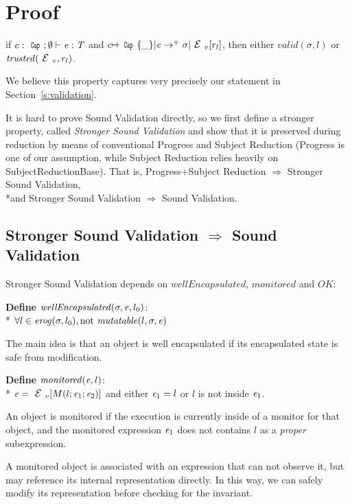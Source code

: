 \appendix
\section{Proof}
\label{s:proof}

\begin{theorem}
	if $c:\Kw{Cap};\emptyset\vdash \e: \T$ and
	$c\mapsto\Kw{Cap}\{\_\}|\e\rightarrow^+ \sigma|\ctx_v[r_l]$, then
	either $valid(\sigma,l)$ or $\mathit{trusted}(\ctx_v,r_l)$.
\end{theorem}

We believe this property captures very precisely our statement in Section~\ref{s:validation}.

It is hard to prove Sound Validation directly,
so we first define a stronger property,
called \emph{Stronger Sound Validation} and
show that it is preserved during reduction by means of conventional
Progress and Subject Reduction (Progress is one of our assumption,
while Subject Reduction relies heavily on SubjectReductionBase).
That is,
Progress+Subject Reduction $\Rightarrow$ Stronger Sound Validation,
\\*and Stronger Sound Validation $\Rightarrow$ Sound Validation.

\subsection{Stronger Sound Validation $\Rightarrow$ Sound Validation}

Stronger Sound Validation depends on
$\mathit{wellEncapsulated}$, $\mathit{monitored}$
and $OK$:

\noindent\textbf{Define} $\mathit{wellEncapsulated}(\sigma,\e,l_0)$:\\*
\indent$\forall l \in \mathit{erog}(\sigma,l_0), \text{not}\ \mathit{mutatable}(l,\sigma,\e)$

\noindent The main idea is that an object is well encapsulated if its encapsulated state is safe from
modification.

\noindent\textbf{Define} $\mathit{monitored}({\mathit{e}},l)$:\\*
\indent$\e=\ctx_v[M(l;\e_1;\e_2)]$ and either ${\mathit{e}}_1=l$ or $l$ is not inside ${\mathit{e}}_1$.

\noindent An object is monitored if the execution
is currently inside of a monitor for that object, and
the monitored expression ${\mathit{e}}_1$ does not
contains $l$ as a \emph{proper} subexpression.

A monitored object is associated with an expression that can not observe it, but may
reference its internal representation directly.
In this way, we can safely modify its representation before checking for the invariant.

